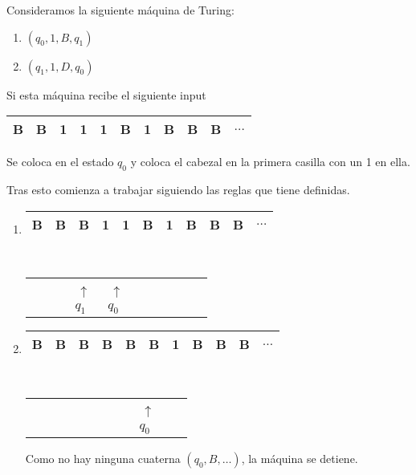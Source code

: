 \begin{example}
	Consideramos la siguiente máquina de Turing:
	\begin{enumerate}
		\item $(q_0, 1, B, q_1)$
		\item $(q_1, 1, D, q_0)$
	\end{enumerate}

	Si esta máquina recibe el siguiente input
	\begin{center}
		\begin{tabular}{|c|c|c|c|c|c|c|c|c|c|c|}
			\hline
			B & B & 1 & 1 & 1 & B & 1 & B & B & B & $\hdots$\\
			\hline
		\end{tabular}
	\end{center}

	Se coloca en el estado $q_0$ y coloca el cabezal en la primera casilla con un 1 en ella.

	Tras esto comienza a trabajar siguiendo las reglas que tiene definidas.
	\begin{enumerate}
		\item \begin{tabular}{|c|c|c|c|c|c|c|c|c|c|c|}
			\hline
			B & B & B & 1 & 1 & B & 1 & B & B & B & $\hdots$\\
			\hline
		\end{tabular}\\
		\begin{tabular}{c c c c c c c c c c c }
			&  &  & \ $\uparrow$ & \ $\uparrow$  &  &  &  &  &  & \\
			&  &  & $q_1$ & $q_0$  &  &  &  &  &  & \\
		\end{tabular}
		\item \begin{tabular}{|c|c|c|c|c|c|c|c|c|c|c|}
			\hline
			B & B & B & B & B & B & 1 & B & B & B & $\hdots$\\
			\hline
		\end{tabular}\\
		\begin{tabular}{c c c c c c c c c c c }
			&  &  &  &  &  &  &  & \ $\uparrow$ &  & \\
			&  &  &  &  &  &  &  & $q_0$ &  & \\
		\end{tabular}

		Como no hay ninguna cuaterna $(q_0, B, \hdots)$, la máquina se detiene.
	\end{enumerate}
\end{example}

